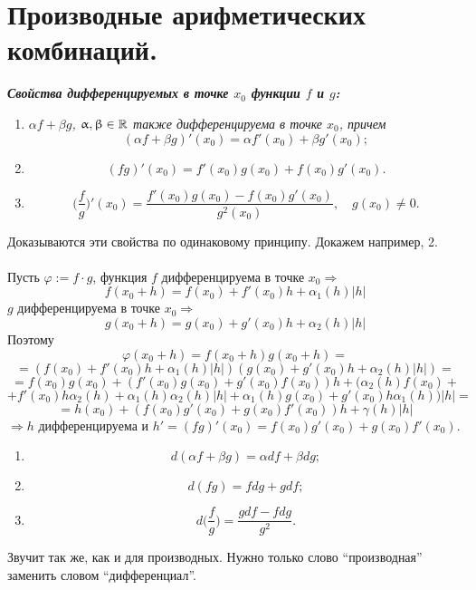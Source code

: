 \section{Производные арифметических комбинаций.}
\textbf{\textit{Свойства дифференцируемых в точке $x_0$  функции $f$ и $g$:}}
\begin{enumerate}
	\item \textit{$\alpha f+\beta g$, $\upalpha, \upbeta \in \mathbb{R}$ также дифференцируема в точке $x_0$, причем $$(\alpha f+\beta g)'(x_0)=\alpha f'(x_0)+\beta g'(x_0);$$}
	\item $$(f g)'(x_0)=f'(x_0)g(x_0)+f(x_0)g'(x_0).$$
	\item $$\Big(\frac{f}{g}\Big)'(x_0)=\frac{f'(x_0)g(x_0)-f(x_0)g'(x_0)}{g^2(x_0) },\quad g(x_0)\not=0.$$
\end{enumerate}
\begin{Proof}
	Доказываются эти свойства по одинаковому принципу. Докажем например, 2.\\\\
	Пусть $\varphi:=f\cdot g$, функция $f$ дифференцируема в точке $x_0 \Rightarrow$ $$f(x_0+h)=f(x_0)+f'(x_0)h+\alpha_1(h)|h|$$
	$g$ дифференцируема в точке $x_0 \Rightarrow$ $$g(x_0+h)=g(x_0)+g'(x_0)h+\alpha_2(h)|h|$$
	Поэтому $$\varphi(x_0+h)=f(x_0+h)g(x_0+h)=$$$$=(f(x_0)+f'(x_0)h+\alpha_1(h)|h|)(g(x_0)+g'(x_0)h+\alpha_2(h)|h|)=$$$$=f(x_0)g(x_0)+(f'(x_0)g(x_0)+g'(x_0)f(x_0))h+(\alpha_2(h)f(x_0)+$$$$+f'(x_0)h\alpha_2(h)+\alpha_1(h)\alpha_2(h)|h|+\alpha_1(h)g(x_0)+g'(x_0)h\alpha_1(h))|h|=$$
	$$=h(x_0)+(f(x_0)g'(x_0)+g(x_0)f'(x_0))h+\gamma(h)|h| $$
	$\Rightarrow h$ дифференцируема и $h'=(f g)'(x_0)=f(x_0)g'(x_0)+g(x_0)f'(x_0)$.
\end{Proof}
\begin{corollary}
	\begin{enumerate}
		\item $$d(\alpha f+\beta g)=\alpha d f+\beta d g;$$
		\item\textit{$$d(f g)=f d g+g d f;$$}
		\item\textit{$$d\Big(\frac{f}{g}\Big)=\frac{g d f-f d g}{g^2}.$$}
	\end{enumerate}
\end{corollary}
Звучит так же, как и для производных. Нужно только слово ``производная'' заменить словом ``дифференциал''.
